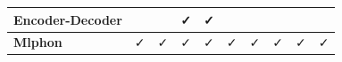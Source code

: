 \begin{table}[htpb]
\begin{center}
\begin{minipage}{280pt}
\begin{tabular}{@{}lccccccccc@{}}
				Encoder-Decoder \cite{Priyamvada_2021}    &                                      &                                              & {\tick ✓}                           & {\tick ✓}                         &                                         &                                     &                                           &                                                                \\
				\hline \textbf{Mlphon}                    & {\tick ✓}                            & {\tick ✓}                                    & {\tick ✓}                           & {\tick ✓}                         & {\tick
				✓}                                        & {\tick ✓}                            & {\tick ✓}                                    & {\tick ✓}                           & {\tick ✓}                                                                                                                                                                                                                      \\

				\hline
			\end{tabular}
		\end{minipage}
	\end{center}
\end{table}

